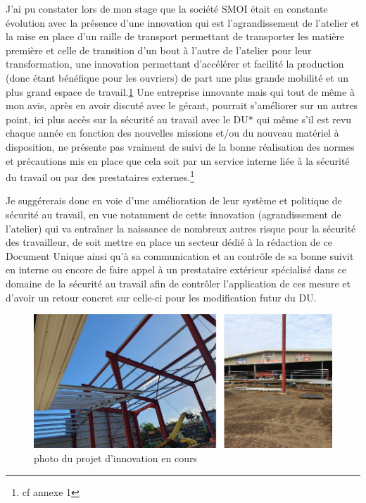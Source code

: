 J'ai pu constater lors de mon stage que la société SMOI était en constante évolution avec la présence d'une innovation qui est l'agrandissement de l'atelier et la mise en place d'un raille de transport permettant de transporter les matière première et celle de transition d'un bout à l'autre de l'atelier pour leur transformation, une innovation permettant d'accélérer et facilité la production (donc étant bénéfique pour les ouvriers) de part une plus grande mobilité et un plus grand espace de travail.\ref{fig:innovation}\newline
Une entreprise innovante mais qui tout de même à mon avis, après en avoir discuté avec le gérant, pourrait s'améliorer sur un autres point, ici plus accès sur la sécurité au travail avec le \acrshort{DU}* qui même s'il est revu chaque année en fonction des nouvelles missions et/ou du nouveau matériel à disposition, ne présente pas vraiment de suivi de la bonne réalisation des normes et précautions mis en place que cela soit par un service interne liée à la sécurité du travail ou par des prestataires externes.\footnote{cf annexe 1} \newline

Je suggérerais donc en voie d'une amélioration de leur système et politique de sécurité au travail, en vue notamment de cette innovation (agrandissement de l'atelier) qui va entraîner la naissance de nombreux autres risque pour la sécurité des travailleur, de soit mettre en place un secteur dédié à la rédaction de ce Document Unique ainsi qu'à sa communication et au contrôle de sa bonne suivit en interne ou encore de faire appel à un prestataire extérieur spécialisé dans ce domaine de la sécurité au travail afin de contrôler l'application de ces mesure et d'avoir un retour concret sur celle-ci pour les modification futur du DU.
\begin{figure}[h!]
    \centering
    \includegraphics[width=1\linewidth]{figures/innovation.png}
    \caption{photo du projet d'innovation en cours}
    \label{fig:innovation}
\end{figure}



